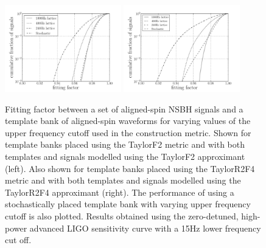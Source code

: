 \begin{figure}
    \centering
    \begin{minipage}[l]{2.0\columnwidth}
    \centering
\includegraphics[width=0.45\textwidth]
{papers/nsbh_effectualness/figure6A.pdf}
\includegraphics[width=0.45\textwidth]
{papers/nsbh_effectualness/figure6B.pdf}
\caption{\label{fig:bankfcutoff}
Fitting factor between a set of aligned-spin \ac{NSBH} signals
and a template bank of aligned-spin waveforms for varying values of the upper
frequency cutoff used in the construction metric. Shown for template banks
placed using the TaylorF2 metric and with both templates and signals 
modelled using the TaylorF2 approximant (left). Also shown for template banks
placed using the TaylorR2F4 metric and with both templates and signals 
modelled using the TaylorR2F4 approximant (right). The
performance of using a stochastically placed template bank with varying upper
frequency cutoff is also plotted. Results obtained
using the zero-detuned, high-power advanced LIGO sensitivity curve with a 15Hz
lower frequency cut off.
}
\end{minipage}
\end{figure}

